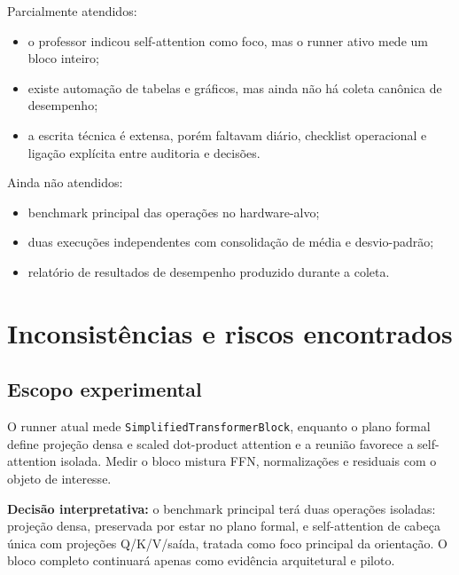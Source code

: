 Parcialmente atendidos:


\begin{itemize}
\item o professor indicou self-attention como foco, mas o runner ativo mede um
bloco inteiro;
\item existe automação de tabelas e gráficos, mas ainda não há coleta canônica de
desempenho;
\item a escrita técnica é extensa, porém faltavam diário, checklist operacional e
ligação explícita entre auditoria e decisões.
\end{itemize}


Ainda não atendidos:


\begin{itemize}
\item benchmark principal das operações no hardware-alvo;
\item duas execuções independentes com consolidação de média e desvio-padrão;
\item relatório de resultados de desempenho produzido durante a coleta.
\end{itemize}


\section{Inconsistências e riscos encontrados}



\subsection{Escopo experimental}






O runner atual mede \texttt{Simplified\allowbreak{}Transformer\allowbreak{}Block}, enquanto o plano formal define projeção densa e scaled dot-product attention e a reunião favorece a self-attention isolada. Medir o bloco mistura FFN, normalizações e residuais com o objeto de interesse.






\textbf{Decisão interpretativa:} o benchmark principal terá duas operações isoladas: projeção densa, preservada por estar no plano formal, e self-attention de cabeça única com projeções Q/K/V/saída, tratada como foco principal da orientação. O bloco completo continuará apenas como evidência arquitetural e piloto.



